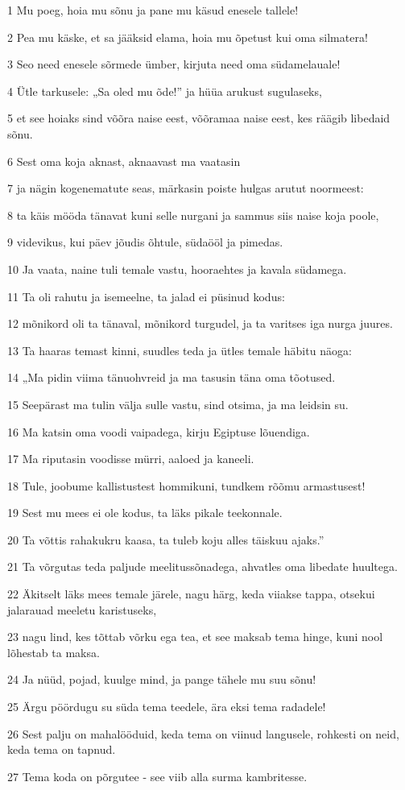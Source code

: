 \par 1 Mu poeg, hoia mu sõnu ja pane mu käsud enesele tallele!
\par 2 Pea mu käske, et sa jääksid elama, hoia mu õpetust kui oma silmatera!
\par 3 Seo need enesele sõrmede ümber, kirjuta need oma südamelauale!
\par 4 Ütle tarkusele: „Sa oled mu õde!” ja hüüa arukust sugulaseks,
\par 5 et see hoiaks sind võõra naise eest, võõramaa naise eest, kes räägib libedaid sõnu.
\par 6 Sest oma koja aknast, aknaavast ma vaatasin
\par 7 ja nägin kogenematute seas, märkasin poiste hulgas arutut noormeest:
\par 8 ta käis mööda tänavat kuni selle nurgani ja sammus siis naise koja poole,
\par 9 videvikus, kui päev jõudis õhtule, südaööl ja pimedas.
\par 10 Ja vaata, naine tuli temale vastu, hooraehtes ja kavala südamega.
\par 11 Ta oli rahutu ja isemeelne, ta jalad ei püsinud kodus:
\par 12 mõnikord oli ta tänaval, mõnikord turgudel, ja ta varitses iga nurga juures.
\par 13 Ta haaras temast kinni, suudles teda ja ütles temale häbitu näoga:
\par 14 „Ma pidin viima tänuohvreid ja ma tasusin täna oma tõotused.
\par 15 Seepärast ma tulin välja sulle vastu, sind otsima, ja ma leidsin su.
\par 16 Ma katsin oma voodi vaipadega, kirju Egiptuse lõuendiga.
\par 17 Ma riputasin voodisse mürri, aaloed ja kaneeli.
\par 18 Tule, joobume kallistustest hommikuni, tundkem rõõmu armastusest!
\par 19 Sest mu mees ei ole kodus, ta läks pikale teekonnale.
\par 20 Ta võttis rahakukru kaasa, ta tuleb koju alles täiskuu ajaks.”
\par 21 Ta võrgutas teda paljude meelitussõnadega, ahvatles oma libedate huultega.
\par 22 Äkitselt läks mees temale järele, nagu härg, keda viiakse tappa, otsekui jalarauad meeletu karistuseks,
\par 23 nagu lind, kes tõttab võrku ega tea, et see maksab tema hinge, kuni nool lõhestab ta maksa.
\par 24 Ja nüüd, pojad, kuulge mind, ja pange tähele mu suu sõnu!
\par 25 Ärgu pöördugu su süda tema teedele, ära eksi tema radadele!
\par 26 Sest palju on mahalööduid, keda tema on viinud langusele, rohkesti on neid, keda tema on tapnud.
\par 27 Tema koda on põrgutee - see viib alla surma kambritesse.

